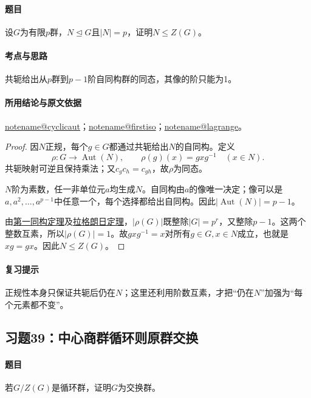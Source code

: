 \documentclass[UTF8,a4paper,11pt,fontset=windows]{ctexart}
\makeatletter
\DeclareMathOperator{\Aut}{Aut}\DeclareMathOperator{\Inn}{Inn}
\newcommand{\noteref}[1]{\hyperref[note:#1]{\csname notename@#1\endcsname}}
\newcommand{\proofref}[2]{\hyperref[note:#1]{#2}}
\newcommand{\exref}[2]{\hyperref[ex:#1:#2]{第#1章习题#2}}
\makeatother
\begin{document}
\paragraph{题目}
设$G$为有限$p$群，$N\trianglelefteq G$且$|N|=p$，证明$N\le Z(G)$。

\paragraph{考点与思路}
共轭给出从$p$群到$p-1$阶自同构群的同态，其像的阶只能为1。

\paragraph{所用结论与原文依据}
\noteref{cyclicaut}；\noteref{firstiso}；\noteref{lagrange}。


\begin{proof}
因$N$正规，每个$g\in G$都通过共轭给出$N$的自同构。定义
\[
\rho:G\longrightarrow\Aut(N),\qquad
\rho(g)(x)=gxg^{-1}\quad(x\in N).
\]
共轭映射可逆且保持乘法；又$c_gc_h=c_{gh}$，故$\rho$为同态。

$N$阶为素数，任一非单位元$a$均生成$N$。自同构由$a$的像唯一决定；像可以是$a,a^2,\ldots,a^{p-1}$中任意一个，每个选择都给出自同构。因此$|\Aut(N)|=p-1$。

由\proofref{firstiso}{第一同构定理}及\proofref{lagrange}{拉格朗日定理}，$|\rho(G)|$既整除$|G|=p^r$，又整除$p-1$。这两个整数互素，所以$|\rho(G)|=1$。故$gxg^{-1}=x$对所有$g\in G,x\in N$成立，也就是$xg=gx$。因此$N\le Z(G)$。
\end{proof}

\paragraph{复习提示}
正规性本身只保证共轭后仍在$N$；这里还利用阶数互素，才把“仍在$N$”加强为“每个元素都不变”。


\subsection{习题39：\texorpdfstring{中心商群循环则原群交换}{中心商群循环则原群交换}}
\label{ex:2:39}

\paragraph{题目}
若$G/Z(G)$是循环群，证明$G$为交换群。
\end{document}

